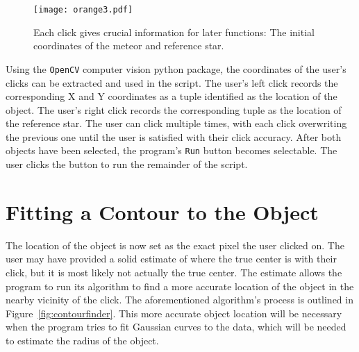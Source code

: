 \begin{figure}[h!]
	\centering
	\texttt{[image: orange3.pdf]}
	\caption{Each click gives crucial information for later functions: The initial coordinates of the meteor and reference star.}
	\label{fig:clickfinder}
\end{figure}

Using the \texttt{OpenCV} computer vision python package, the coordinates of the user's clicks can be extracted and used in the script. The user's left click records the corresponding X and Y coordinates as a tuple identified as the location of the object. The user's right click records the corresponding tuple as the location of the reference star. The user can click multiple times, with each click overwriting the previous one until the user is satisfied with their click accuracy. After both objects have been selected, the program's \texttt{Run} button becomes selectable. The user clicks the button to run the remainder of the script.


\section{Fitting a Contour to the Object}
The location of the object is now set as the exact pixel the user clicked on. The user may have provided a solid estimate of where the true center is with their click, but it is most likely not actually the true center. The estimate allows the program to run its algorithm to find a more accurate location of the object in the nearby vicinity of the click. The aforementioned algorithm's process is outlined in Figure~\ref{fig:contourfinder}. This more accurate object location will be necessary when the program tries to fit Gaussian curves to the data, which will be needed to estimate the radius of the object.

